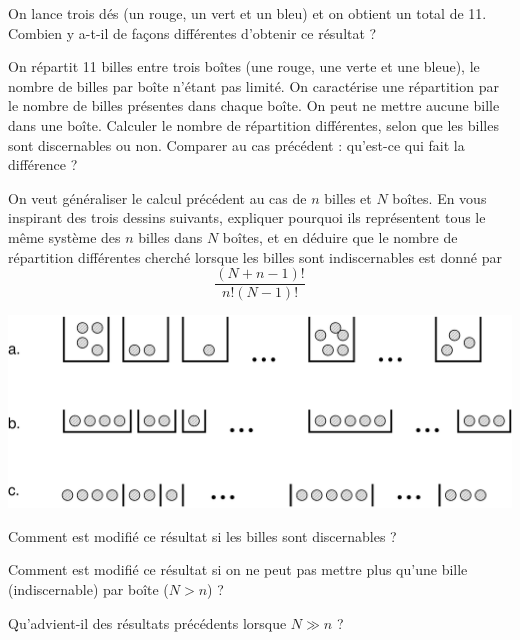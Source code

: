 \question
On lance trois dés (un rouge, un vert et un bleu) et on obtient un total de 11. Combien y a-t-il de façons différentes d'obtenir ce résultat ? 

\question
On répartit 11 billes entre trois boîtes (une rouge, une verte et une bleue), le nombre de billes par boîte n'étant pas limité. On caractérise une répartition par le nombre de billes présentes dans chaque boîte. On peut ne mettre aucune bille dans une boîte. Calculer le nombre de répartition différentes, selon que les billes sont discernables ou non. Comparer au cas précédent : qu'est-ce qui fait la différence ?

\question
On veut généraliser le calcul précédent au cas de $n$ billes et $N$ boîtes. En vous inspirant des trois dessins suivants, expliquer pourquoi ils représentent  tous le même système des $n$ billes dans $N$ boîtes, et en déduire que le nombre de répartition différentes cherché lorsque les billes sont indiscernables est donné par
$$
\frac{(N+n-1)!}{n! (N-1)!}
$$

\centerline{\includegraphics[height=.3\textwidth]{../Fig/billes}}

\question
Comment est modifié ce résultat si les billes sont discernables ?

\question
Comment est modifié ce résultat si on ne peut pas mettre plus qu'une bille (indiscernable) par boîte ($N>n$) ?

\question
Qu'advient-il des résultats précédents lorsque $N\gg n$ ?
